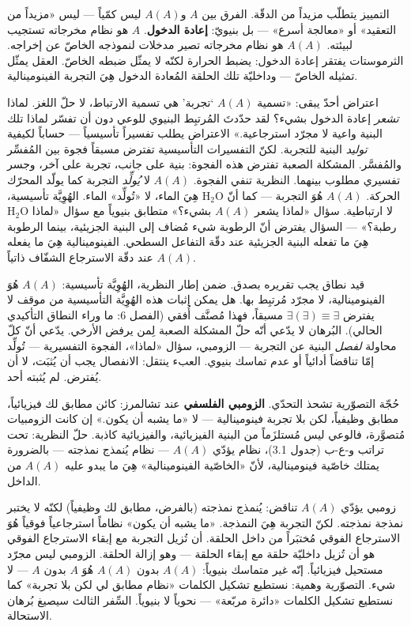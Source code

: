 \documentclass[10pt, openany, oneside]{book}
\begin{document}
التمييز يتطلّب مزيداً من الدقّة. الفرق بين $A$ و$A(A)$ ليس كمّياً --- ليس «مزيداً من التعقيد» أو «معالجة أسرع» --- بل بنيويّ: \textbf{إعادة الدخول}. $A$ هو نظام مخرجاته تستجيب لبيئته. $A(A)$ هو نظام مخرجاته تصير مدخلات لنموذجه الخاصّ عن إخراجه. الثرموستات يفتقر إعادة الدخول: يضبط الحرارة لكنّه لا يمثّل ضبطه الخاصّ. العقل يمثّل تمثيله الخاصّ --- وداخليّة تلك الحلقة المُعادة الدخول هِيَ التجربة الفينومينالية.

اعتراض أحدّ يبقى: «تسمية $A(A)$ `تجربة' هي تسمية الارتباط، لا حلّ اللغز. لماذا \textit{تشعر} إعادة الدخول بشيء؟ لقد حدّدتَ المُرتبِط البنيوي للوعي دون أن تفسّر لماذا تلك البنية واعية لا مجرّد استرجاعية.» الاعتراض يطلب تفسيراً تأسيسياً --- حساباً لكيفية \textit{توليد} البنية للتجربة. لكنّ التفسيرات التأسيسية تفترض مسبقاً فجوة بين المُفسِّر والمُفسَّر. المشكلة الصعبة تفترض هذه الفجوة: بنية على جانب، تجربة على آخر، وجسر تفسيري مطلوب بينهما. النظرية تنفي الفجوة. $A(A)$ لا \textit{يُولِّد} التجربة كما يولّد المحرّك الحركة. $A(A)$ هُوَ التجربة --- كما أنّ $\text{H}_2\text{O}$ هِيَ الماء، لا «تُولِّد» الماء. الهُوِيَّة تأسيسية، لا ارتباطية. سؤال «لماذا يشعر $A(A)$ بشيء؟» متطابق بنيوياً مع سؤال «لماذا $\text{H}_2\text{O}$ رطبة؟» --- السؤال يفترض أنّ الرطوبة شيء مُضاف إلى البنية الجزيئية، بينما الرطوبة هِيَ ما تفعله البنية الجزيئية عند دقّة التفاعل السطحي. الفينومينالية هِيَ ما يفعله $A(A)$ عند دقّة الاسترجاع الشفّاف ذاتياً.

قيد نطاق يجب تقريره بصدق. ضمن إطار النظرية، الهُوِيَّة تأسيسية: $A(A)$ هُوَ الفينومينالية، لا مجرّد مُرتبِط بها. هل يمكن إثبات هذه الهُوِيَّة التأسيسية من موقف لا يفترض $\exists(\exists) \equiv \exists$ مسبقاً، فهذا مُصنَّف أُفقي (الفصل 6: ما وراء النطاق التأكيدي الحالي). البُرهان لا يدّعي أنّه حلّ المشكلة الصعبة لِمن يرفض الأرخي. يدّعي أنّ كلّ محاولة \textit{لفصل} البنية عن التجربة --- الزومبي، سؤال «لماذا»، الفجوة التفسيرية --- تُولِّد إمّا تناقضاً أدائياً أو عدم تماسك بنيوي. العبء ينتقل: الانفصال يجب أن يُثبَت، لا أن يُفترض. لم يُثبته أحد.

حُجّة التصوّرية تشحذ التحدّي. \textbf{الزومبي الفلسفي} عند تشالمرز: كائن مطابق لك فيزيائياً، مطابق وظيفياً، لكن بلا تجربة فينومينالية --- لا «ما يشبه أن يكون.» إن كانت الزومبيات مُتصوَّرة، فالوعي ليس مُستلزَماً من البنية الفيزيائية، والفيزيائية كاذبة. حلّ النظرية: تحت تراتب و-ع-ب (جدول 3.1)، نظام يؤدّي $A(A)$ --- نظام يُنمذج نمذجته --- بالضرورة يمتلك خاصّية فينومينالية، لأنّ «الخاصّية الفينومينالية» هِيَ ما يبدو عليه $A(A)$ من الداخل.

زومبي يؤدّي $A(A)$ تناقض: يُنمذج نمذجته (بالفرض، مطابق لك وظيفياً) لكنّه لا يختبر نمذجة نمذجته. لكنّ التجربة هِيَ النمذجة. «ما يشبه أن يكون» نظاماً استرجاعياً فوقياً هُوَ الاسترجاع الفوقي مُختبَراً من داخل الحلقة. أن تُزيل التجربة مع إبقاء الاسترجاع الفوقي هو أن تُزيل داخليّة حلقة مع إبقاء الحلقة --- وهو إزالة الحلقة. الزومبي ليس مجرّد مستحيل فيزيائياً. إنّه غير متماسك بنيوياً: $A(A)$ بدون $A(A)$ هُوَ $A$ بدون $A$ --- لا شيء. التصوّرية وهمية: نستطيع تشكيل الكلمات «نظام مطابق لي لكن بلا تجربة» كما نستطيع تشكيل الكلمات «دائرة مربّعة» --- نحوياً لا بنيوياً. السِّفر الثالث سيصيغ بُرهان الاستحالة.
\end{document}
